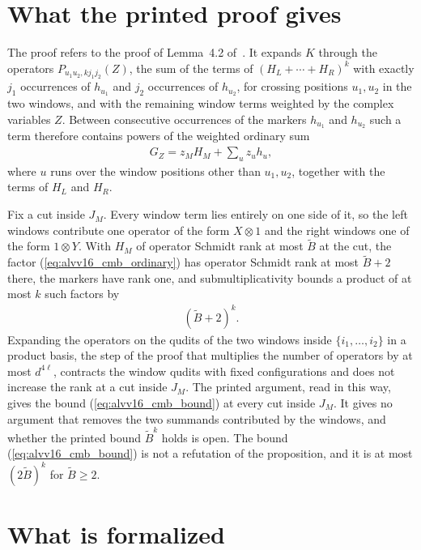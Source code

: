\documentclass{article}
\begin{document}
\section{What the printed proof gives}

The proof refers to the proof of Lemma~4.2 of~\cite{Arad2013AreaLaw}. It expands $K$
through the operators $P_{u_1u_2,kj_1j_2}(Z)$, the sum of the terms of
$(H_L+\cdots+H_R)^k$ with exactly $j_1$ occurrences of $h_{u_1}$ and $j_2$
occurrences of $h_{u_2}$, for crossing positions $u_1,u_2$ in the two windows,
and with the remaining window terms weighted by the complex variables $Z$.
Between consecutive occurrences of the markers $h_{u_1}$ and $h_{u_2}$ such a
term therefore contains powers of the weighted ordinary sum
\begin{align}
 G_Z=z_MH_M+\sum_{u}z_uh_u ,
 \label{eq:alvv16_cmb_ordinary}
\end{align}
where $u$ runs over the window positions other than $u_1,u_2$, together with
the terms of $H_L$ and $H_R$.

Fix a cut inside $J_M$. Every window term lies entirely on one side of it, so
the left windows contribute one operator of the form $X\otimes 1$ and the right
windows one of the form $1\otimes Y$. With $H_M$ of operator Schmidt rank at
most $\tilde B$ at the cut, the factor (\ref{eq:alvv16_cmb_ordinary}) has
operator Schmidt rank at most $\tilde B+2$ there, the markers have rank one,
and submultiplicativity bounds a product of at most $k$ such factors by
\begin{align}
 (\tilde B+2)^k .
 \label{eq:alvv16_cmb_bound}
\end{align}
Expanding the operators on the qudits of the two windows inside
$\{i_1,\ldots,i_2\}$ in a product basis, the step of the proof that multiplies
the number of operators by at most $d^{4\ell}$, contracts the window qudits
with fixed configurations and does not increase the rank at a cut inside
$J_M$. The printed argument, read in this way, gives the bound
(\ref{eq:alvv16_cmb_bound}) at every cut inside $J_M$. It gives no argument
that removes the two summands contributed by the windows, and whether the
printed bound $\tilde B^k$ holds is open. The bound
(\ref{eq:alvv16_cmb_bound}) is not a refutation of the proposition, and it is
at most $(2\tilde B)^k$ for $\tilde B\geq2$.

\section{What is formalized}
\end{document}
